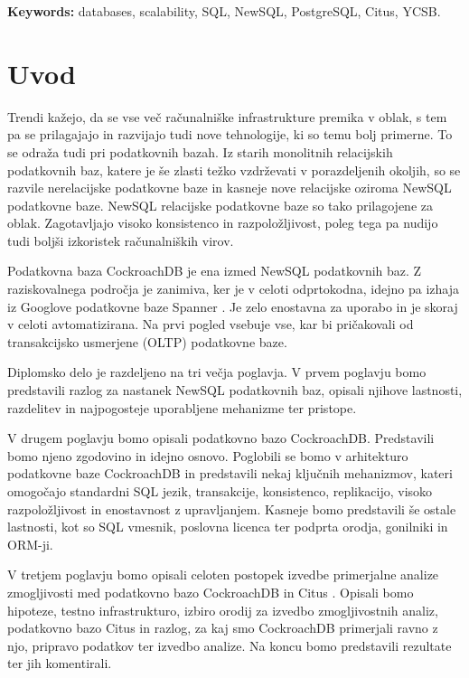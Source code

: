 \documentclass[a4paper, 12pt]{book}
\newcommand{\tkeywordsEn}{databases, scalability, SQL, NewSQL, PostgreSQL, Citus, YCSB}
\newcommand{\clearemptydoublepage}{\newpage{\pagestyle{empty}\cleardoublepage}}
\begin{document}
\noindent\textbf{Keywords:} \tkeywordsEn.
\clearemptydoublepage

\mainmatter
\setcounter{page}{1}
\pagestyle{fancy}


\chapter{Uvod}
Trendi kažejo, da se vse več računalniške infrastrukture premika v oblak, s tem pa se prilagajajo in razvijajo tudi nove tehnologije, ki so temu bolj primerne. To se odraža tudi pri podatkovnih bazah. Iz starih monolitnih relacijskih podatkovnih baz, katere je še zlasti težko vzdrževati v porazdeljenih okoljih, so se razvile nerelacijske podatkovne baze in kasneje nove relacijske oziroma NewSQL podatkovne baze. NewSQL relacijske podatkovne baze so tako prilagojene za oblak. Zagotavljajo visoko konsistenco in razpoložljivost, poleg tega pa nudijo tudi boljši izkoristek računalniških virov.

Podatkovna baza CockroachDB \cite{cockroachdb/cockroach} je ena izmed NewSQL podatkovnih baz. Z raziskovalnega področja je zanimiva, ker je v celoti odprtokodna, idejno pa izhaja iz Googlove podatkovne baze Spanner \cite{spanner-home}. Je zelo enostavna za uporabo in je skoraj v celoti avtomatizirana. Na prvi pogled vsebuje vse, kar bi pričakovali od transakcijsko usmerjene (OLTP) podatkovne baze. 

Diplomsko delo je razdeljeno na tri večja poglavja. V prvem poglavju bomo predstavili razlog za nastanek NewSQL podatkovnih baz, opisali njihove lastnosti, razdelitev in najpogosteje uporabljene mehanizme ter pristope.

V drugem poglavju bomo opisali podatkovno bazo CockroachDB. Predstavili bomo njeno zgodovino in idejno osnovo. Poglobili se bomo v arhitekturo podatkovne baze CockroachDB in predstavili nekaj ključnih mehanizmov, kateri omogočajo standardni SQL jezik, transakcije, konsistenco, replikacijo, visoko razpoložljivost in enostavnost z upravljanjem. Kasneje bomo predstavili še ostale lastnosti, kot so SQL vmesnik, poslovna licenca ter podprta orodja, gonilniki in ORM-ji.

V tretjem poglavju bomo opisali celoten postopek izvedbe primerjalne analize zmogljivosti med podatkovno bazo CockroachDB in Citus \cite{citus}. Opisali bomo hipoteze, testno infrastrukturo, izbiro orodij za izvedbo zmogljivostnih analiz, podatkovno bazo Citus in razlog, za kaj smo CockroachDB primerjali ravno z njo, pripravo podatkov ter izvedbo analize. Na koncu bomo predstavili rezultate ter jih komentirali.
\end{document}
